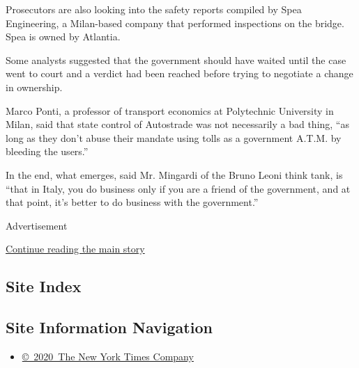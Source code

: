 Prosecutors are also looking into the safety reports compiled by Spea
Engineering, a Milan-based company that performed inspections on the
bridge. Spea is owned by Atlantia.

Some analysts suggested that the government should have waited until the
case went to court and a verdict had been reached before trying to
negotiate a change in ownership.

Marco Ponti, a professor of transport economics at Polytechnic
University in Milan, said that state control of Autostrade was not
necessarily a bad thing, ``as long as they don't abuse their mandate
using tolls as a government A.T.M. by bleeding the users.''

In the end, what emerges, said Mr. Mingardi of the Bruno Leoni think
tank, is ``that in Italy, you do business only if you are a friend of
the government, and at that point, it's better to do business with the
government.''

Advertisement

\protect\hyperlink{after-bottom}{Continue reading the main story}

\hypertarget{site-index}{%
\subsection{Site Index}\label{site-index}}

\hypertarget{site-information-navigation}{%
\subsection{Site Information
Navigation}\label{site-information-navigation}}

\begin{itemize}
\tightlist
\item
  \href{https://help.nytimes.com/hc/en-us/articles/115014792127-Copyright-notice}{©~2020~The
  New York Times Company}
\end{itemize}

